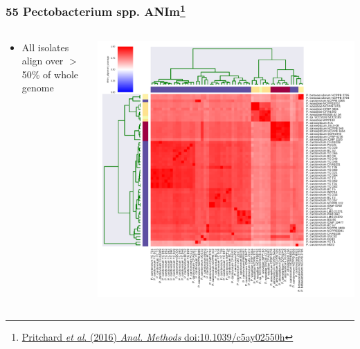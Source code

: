 \begin{frame}
  \frametitle{55 Pectobacterium spp. ANIm\footnote{\tiny{\href{http://dx.doi.org/10.1039/c5ay02550h}{Pritchard \textit{et al}. (2016) \textit{Anal. Methods} doi:10.1039/c5ay02550h}}}}
  \begin{columns}[T]
    \begin{column}{3cm}
      \begin{itemize}
        \item All isolates align over $>$50\% of whole genome
      \end{itemize}
    \end{column}
    \begin{column}{7cm}
      \includegraphics[width=1\textwidth]{images/Pecto_ANIm_alignment_coverage}
    \end{column}
  \end{columns}
\end{frame}

